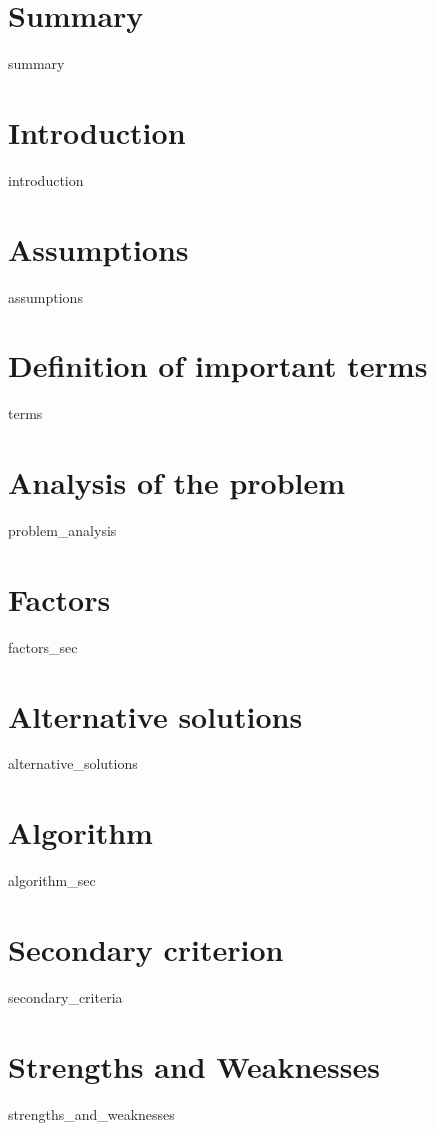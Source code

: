 \section{Summary}
{summary}

\clearpage

\section{Introduction}
{introduction}

\section{Assumptions}
{assumptions}

\section{Definition of important terms}
\begin{labeling}{\hspace{3cm}}
{terms}
\end{labeling}

\section{Analysis of the problem}
{problem_analysis}

\section{Factors}
{factors_sec}

\section{Alternative solutions}
{alternative_solutions}

\section{Algorithm}
{algorithm_sec}

\section{Secondary criterion}
{secondary_criteria}

\section{Strengths and Weaknesses}
{strengths_and_weaknesses}

